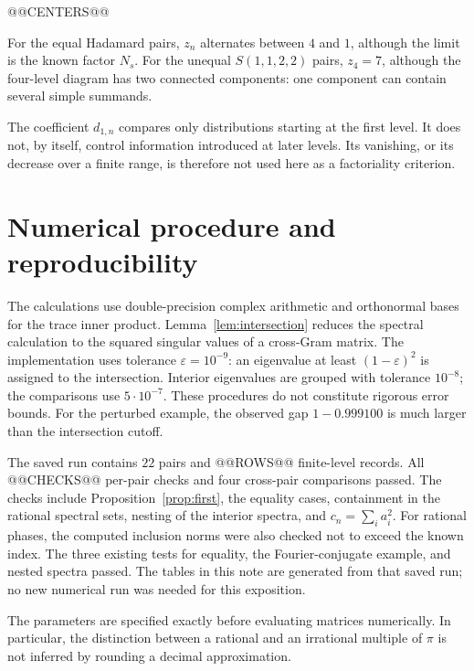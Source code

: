 \documentclass[11pt]{article}
\theoremstyle{definition}
\theoremstyle{remark}
\begin{document}
@@CENTERS@@

For the equal Hadamard pairs, \(z_n\) alternates between \(4\) and
\(1\), although the limit is the known factor \(N_s\).
For the unequal \(S(1,1,2,2)\) pairs, \(z_4=7\), although the
four-level diagram has two connected components: one component
can contain several simple summands.

The coefficient \(d_{1,n}\) compares only distributions starting at
the first level. It does not, by itself, control information introduced
at later levels. Its vanishing, or its decrease over a finite range,
is therefore not used here as a factoriality criterion.

\section{Numerical procedure and reproducibility}\label{sec:numerics}
The calculations use double-precision complex arithmetic and
orthonormal bases for the trace inner product. Lemma~\ref{lem:intersection}
reduces the spectral calculation to the squared singular values
of a cross-Gram matrix. The implementation uses tolerance
\(\varepsilon=10^{-9}\): an eigenvalue at least
\((1-\varepsilon)^2\) is assigned to the intersection.
Interior eigenvalues are grouped with tolerance \(10^{-8}\);
the comparisons use \(5\cdot10^{-7}\).
These procedures do not constitute rigorous error bounds.
For the perturbed example, the observed gap \(1-0.999100\)
is much larger than the intersection cutoff.

The saved run contains \(22\) pairs and @@ROWS@@ finite-level records.
All @@CHECKS@@ per-pair checks and four cross-pair comparisons passed.
The checks include Proposition~\ref{prop:first}, the equality cases,
containment in the rational spectral sets, nesting of the interior
spectra, and \(c_n=\sum_i a_i^2\).
For rational phases, the computed inclusion norms were also checked
not to exceed the known index. The three existing tests for equality,
the Fourier-conjugate example, and nested spectra passed.
The tables in this note are generated from that saved run; no new
numerical run was needed for this exposition.

The parameters are specified exactly before evaluating matrices
numerically. In particular, the distinction between a rational
and an irrational multiple of \(\pi\) is not inferred by rounding
a decimal approximation.
\end{document}

